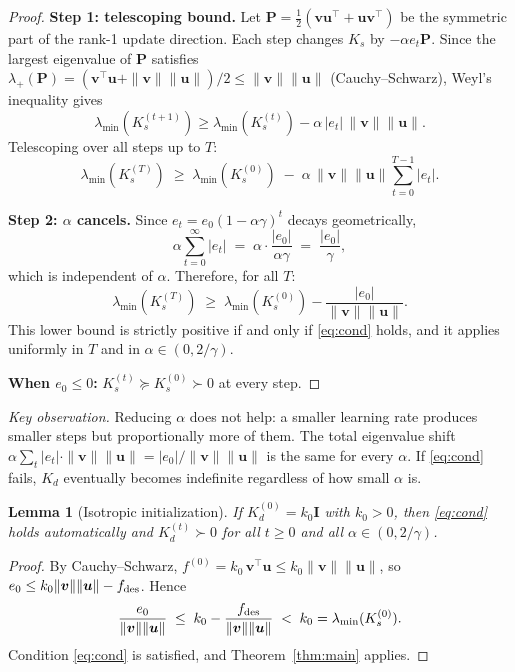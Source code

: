 \documentclass[11pt]{article}
\newcommand{\vv}[1]{\bm{#1}}
\newcommand{\mm}[1]{\mathbf{#1}}
\theoremstyle{plain}
\newtheorem{lemma}{Lemma}
\theoremstyle{definition}
\begin{document}
\begin{proof}
\textbf{Step 1: telescoping bound.}
Let $\mm{P}=\tfrac{1}{2}(\vv{v}\vv{u}^{\top}+\vv{u}\vv{v}^{\top})$
be the symmetric part of the rank-1 update direction.
Each step changes $K_s$ by $-\alpha e_t\mm{P}$.
Since the largest eigenvalue of $\mm{P}$ satisfies
$\lambda_+(\mm{P})=(\vv{v}^{\top}\vv{u}+\|\vv{v}\|\|\vv{u}\|)/2\leq\|\vv{v}\|\|\vv{u}\|$
(Cauchy--Schwarz), Weyl's inequality gives
\[
  \lambda_{\min}(K_s^{(t+1)}) \geq \lambda_{\min}(K_s^{(t)}) - \alpha\,|e_t|\,\|\vv{v}\|\|\vv{u}\|.
\]
Telescoping over all steps up to $T$:
\[
  \lambda_{\min}(K_s^{(T)})
  \;\geq\;
  \lambda_{\min}(K_s^{(0)})
  \;-\;
  \alpha\,\|\vv{v}\|\|\vv{u}\|\sum_{t=0}^{T-1}|e_t|.
\]

\textbf{Step 2: $\alpha$ cancels.}
Since $e_t = e_0(1-\alpha\gamma)^t$ decays geometrically,
\[
  \alpha\sum_{t=0}^{\infty}|e_t|
  \;=\;
  \alpha\cdot\frac{|e_0|}{\alpha\gamma}
  \;=\;
  \frac{|e_0|}{\gamma},
\]
which is independent of $\alpha$.
Therefore, for all $T$:
\[
  \lambda_{\min}(K_s^{(T)})
  \;\geq\;
  \lambda_{\min}(K_s^{(0)}) - \frac{|e_0|}{\|\vv{v}\|\|\vv{u}\|}.
\]
This lower bound is strictly positive if and only if \eqref{eq:cond} holds,
and it applies uniformly in $T$ and in $\alpha\in(0,2/\gamma)$.

\textbf{When $e_0\leq 0$:} $K_s^{(t)}\succeq K_s^{(0)}\succ 0$ at every step.
\end{proof}

\noindent
\textit{Key observation.}
Reducing $\alpha$ does not help: a smaller learning rate produces smaller
steps but proportionally more of them. The total eigenvalue shift
$\alpha\sum_t|e_t|\cdot\|\vv{v}\|\|\vv{u}\| = |e_0|/\|\vv{v}\|\|\vv{u}\|$
is the same for every $\alpha$.
If \eqref{eq:cond} fails, $K_d$ eventually becomes indefinite
regardless of how small $\alpha$ is.

\begin{lemma}[Isotropic initialization]\label{lem:iso}
If $K_d^{(0)}=k_0\mm{I}$ with $k_0>0$, then \eqref{eq:cond} holds automatically
and $K_d^{(t)}\succ 0$ for all $t\geq 0$ and all $\alpha\in(0,2/\gamma)$.
\end{lemma}
\begin{proof}
By Cauchy--Schwarz,
$f^{(0)} = k_0\,\vv{v}^{\top}\vv{u} \leq k_0\|\vv{v}\|\|\vv{u}\|$,
so $e_0 \leq k_0\|\vv{v}\|\|\vv{u}\| - f_{\rm des}$.
Hence
\[
  \frac{e_0}{\|\vv{v}\|\|\vv{u}\|}
  \;\leq\; k_0 - \frac{f_{\rm des}}{\|\vv{v}\|\|\vv{u}\|}
  \;<\; k_0 = \lambda_{\min}(K_s^{(0)}).
\]
Condition \eqref{eq:cond} is satisfied, and Theorem~\ref{thm:main} applies.
\end{proof}
\end{document}

